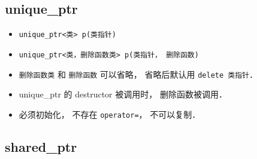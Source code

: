 
\begin{issues}
\issueDraft
\end{issues}

\subsection{unique_ptr}
\begin{itemize}
\item \verb|unique_ptr<类> p(类指针)|
\item \verb|unique_ptr<类，删除函数类> p(类指针， 删除函数)|
\item \verb|删除函数类| 和 \verb|删除函数| 可以省略， 省略后默认用 \verb|delete 类指针|．
\item unique_ptr 的 destructor 被调用时， 删除函数被调用．
\item 必须初始化， 不存在 \verb|operator=|， 不可以复制．
\end{itemize}

\subsection{shared_ptr}